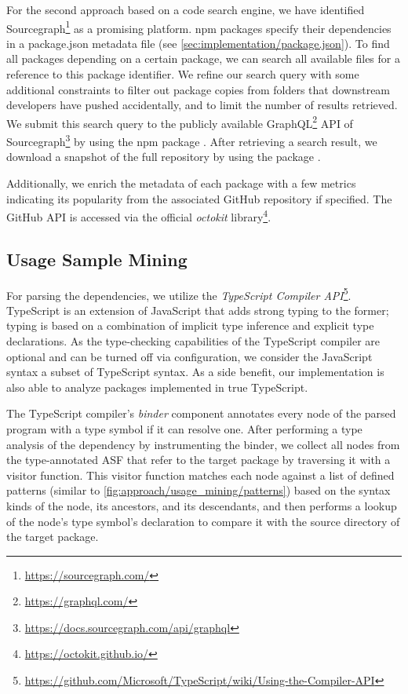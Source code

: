 For the second approach based on a code search engine, we have identified Sourcegraph\footnote{\url{https://sourcegraph.com/}} as a promising platform.
npm packages specify their dependencies in a package.json metadata file (see \cref{sec:implementation/package.json}).
To find all packages depending on a certain package, we can search all available  files for a reference to this package identifier.
We refine our search query with some additional constraints to filter out package copies from  folders that downstream developers have pushed accidentally, and to limit the number of results retrieved.
We submit this search query to the publicly available GraphQL\footnote{\url{https://graphql.com/}} API of Sourcegraph\footnote{\url{https://docs.sourcegraph.com/api/graphql}} by using the npm package .
After retrieving a search result, we download a snapshot of the full repository by using the package .

Additionally, we enrich the metadata of each package with a few metrics indicating its popularity from the associated GitHub repository if specified.
The GitHub API is accessed via the official \emph{octokit} library\footnote{\url{https://octokit.github.io/}}.

\subsection{Usage Sample Mining}
\label{sec:implementation/usage_mining}

For parsing the dependencies, we utilize the \emph{TypeScript Compiler API}\footnote{\url{https://github.com/Microsoft/TypeScript/wiki/Using-the-Compiler-API}}.
TypeScript is an extension of JavaScript that adds strong typing to the former; typing is based on a combination of implicit type inference and explicit type declarations.
As the type-checking capabilities of the TypeScript compiler are optional and can be turned off via configuration, we consider the JavaScript syntax a subset of TypeScript syntax.
As a side benefit, our implementation is also able to analyze packages implemented in true TypeScript.

The TypeScript compiler's \emph{binder} component annotates every node of the parsed program with a type symbol if it can resolve one.
After performing a type analysis of the dependency by instrumenting the binder, we collect all nodes from the type-annotated ASF that refer to the target package by traversing it with a visitor function.
This visitor function matches each node against a list of defined patterns (similar to \cref{fig:approach/usage_mining/patterns}) based on the syntax kinds of the node, its ancestors, and its descendants, and then performs a lookup of the node's type symbol's declaration to compare it with the source directory of the target package.

